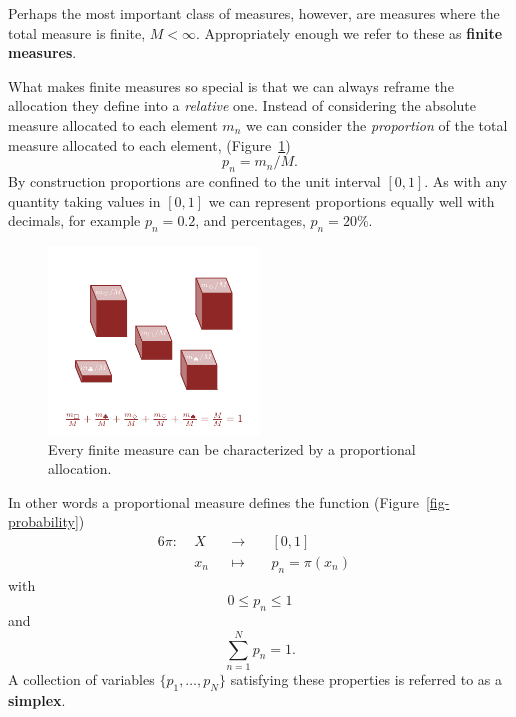 \documentclass[
  letterpaper,
  DIV=11,
  numbers=noendperiod]{scrartcl}
\begin{document}
Perhaps the most important class of measures, however, are measures
where the total measure is finite, \(M < \infty\). Appropriately enough
we refer to these as \textbf{finite measures}.

What makes finite measures so special is that we can always reframe the
allocation they define into a \emph{relative} one. Instead of
considering the absolute measure allocated to each element \(m_{n}\) we
can consider the \emph{proportion} of the total measure allocated to
each element, (Figure~\ref{fig-proportional}) \[
p_{n} = m_{n} / M.
\] By construction proportions are confined to the unit interval
\([0, 1]\). As with any quantity taking values in \([0, 1]\) we can
represent proportions equally well with decimals, for example
\(p_{n} = 0.2\), and percentages, \(p_{n} = 20\%\).

\begin{figure}

{\centering \includegraphics[width=0.5\textwidth,height=\textheight]{figures/proportional_measure/proportional_measure.pdf}

}

\caption{\label{fig-proportional}Every finite measure can be
characterized by a proportional allocation.}

\end{figure}

In other words a proportional measure defines the function
(Figure~\ref{fig-probability}) \begin{alignat*}{6}
\pi :\; & X & &\rightarrow& \; & [0, 1] &
\\
& x_{n} & &\mapsto& & p_{n} = \pi(x_{n}) &
\end{alignat*} with \[
0 \le p_{n} \le 1
\] and \[
\sum_{n = 1}^{N} p_{n} = 1.
\] A collection of variables \(\{ p_{1}, \ldots, p_{N} \}\) satisfying
these properties is referred to as a \textbf{simplex}.
\end{document}
